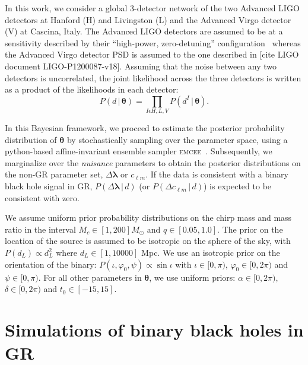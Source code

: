 \documentclass[prd,preprintnumbers,twocolumn,eqsecnum,floatfix,a4paper,nofootinbib,superscriptaddress]{revtex4}
\newcommand{\blambda}{\bm{\lambda}}
\newcommand{\btheta}{\bm{\theta}}
\begin{document}
In this work, we consider a global 3-detector network of the two Advanced LIGO detectors at Hanford (H) and Livingston (L) and the Advanced Virgo detector (V) at Cascina, Italy. The Advanced LIGO detectors are assumed to be at a sensitivity described by their ``high-power, zero-detuning'' configuration~\cite{aLIGOZeroDetHighPower} whereas the Advanced Virgo detector PSD is assumed to the one described in [cite LIGO document LIGO-P1200087-v18]. Assuming that the noise between any two detectors is uncorrelated, the joint likelihood across the three detectors is written as a product of the likelihoods in each detector:
\begin{equation}
P (d \, | \, {\btheta}) = \prod_{I \epsilon {H,L,V}} P (d^{I} \, | \, {\btheta}).
\end{equation}

In this Bayesian framework, we proceed to estimate the posterior probability distribution of $\btheta$ by stochastically sampling over the parameter space, using a python-based affine-invariant ensemble sampler \textsc{emcee}~\cite{foreman2013emcee, goodman2010ensemble}. Subsequently, we marginalize over the \textit{nuisance} parameters to obtain the posterior distributions on the non-GR parameter set, ${\Delta \blambda}$ or $c_{\ell m}$. If the data is consistent with a binary black hole signal in GR, $P(\Delta \blambda \, | \, d)$ (or $P(\Delta c_{\ell m} \, | \, d)$) is expected to be consistent with zero. 

We assume uniform prior probability distributions on the chirp mass and mass ratio in the interval $M_c \in [1,200] M_\odot$ and $q \in [0.05,1.0]$. The prior on the location of the source is  assumed to be isotropic on the sphere of  the  sky,  with $P({d_L}) \propto d_{L}^{2}$ where $d_L \in [1,10000]$ Mpc. We use an  isotropic  prior  on  the  orientation  of  the  binary: $P({\iota,\varphi_0,\psi}) \propto \sin\iota$ with $\iota \in [0,\pi)$, $\varphi_0 \in [0,2\pi)$ and $\psi \in [0,\pi)$. For all other parameters in $\btheta$, we use uniform priors: $\alpha \in [0,2\pi)$, $\delta \in [0,2\pi)$ and $t_0 \in [-15,15]$. 

\section{Simulations of binary black holes in GR}
\label{sec:simulations}
\end{document}
